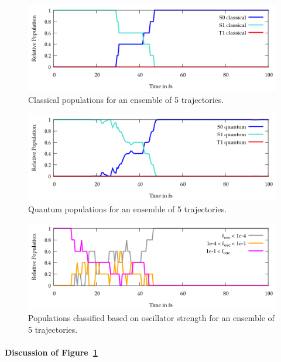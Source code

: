 \documentclass[a4paper,11pt,DIV=15,openany]{scrbook}
\begin{document}
\begin{figure}[p]
  \centering
  \includegraphics[width=\textwidth]{figures/pop_class.png}
  \caption{Classical populations for an ensemble of 5 trajectories.}
  \label{fig:pop_class}
\end{figure}
\begin{figure}[p]
  \centering
  \includegraphics[width=\textwidth]{figures/pop_quant.png}
  \caption{Quantum populations for an ensemble of 5 trajectories.}
  \label{fig:pop_quant}
\end{figure}
\begin{figure}[p]
  \centering
  \includegraphics[width=\textwidth]{figures/pop_fosc.png}
  \caption{Populations classified based on oscillator strength for an ensemble of 5 trajectories.}
  \label{fig:pop_fosc}
\end{figure}



\paragraph{Discussion of Figure~\ref{fig:pop_class}}
\end{document}
